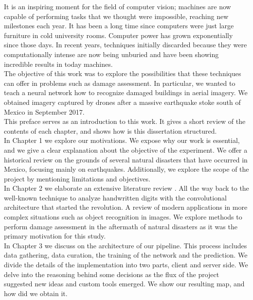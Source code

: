 It is an inspiring moment for the field of computer vision; machines are now capable of performing tasks that we thought were impossible, reaching new milestones each year. It has been a long time since computers were just large furniture in cold university rooms. Computer power has grown exponentially since those days. In recent years, techniques initially discarded because they were computationally intense are now being unburied and have been showing incredible results in today machines.\\

The objective of this work was to explore the possibilities that these techniques can offer in problems such as damage assessment. In particular, we wanted to teach a neural network how to recognize damaged buildings in aerial imagery. We obtained imagery captured by drones after a massive earthquake stoke south of Mexico in September 2017.\\

This preface serves as an introduction to this work. It gives a short review of the contents of each chapter, and shows how is this dissertation structured.\\

In Chapter 1 we explore our motivations. We expose why our work is essential, and we give a clear explanation about the objective of the experiment. We offer a historical review on the grounds of several natural disasters that have occurred in Mexico, focusing mainly on earthquakes. Additionally, we explore the scope of the project by mentioning limitations and objectives.\\

In Chapter 2 we elaborate an extensive literature review . All the way back to the well-known technique to analyze handwritten digits with the convolutional architecture that started the revolution. A review of modern applications in more complex situations such as object recognition in images. We explore methods to perform damage assessment in the aftermath of natural disasters as it was the primary motivation for this study.\\

In Chapter 3 we discuss on the architecture of our pipeline. This process includes data gathering, data curation, the training of the network and the prediction. We divide the details of the implementation into two parts, client and server side. We delve into the reasoning behind some decisions as the flux of the project suggested new ideas and custom tools emerged. We show our resulting map, and how did we obtain it.\\

